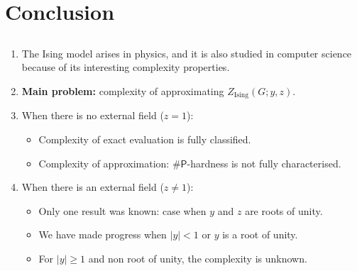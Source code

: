 \section{Conclusion}
\subsection{}

\begin{frame}
	\begin{enumerate}		
		\item The Ising model arises in physics, and it is also studied in computer science because of its interesting complexity properties.
		
		\vspace{3mm}
		\item \textbf{Main problem:} complexity of approximating $Z_{\text{Ising}}(G; y, z)$.

		\vspace{3mm}		
		\item When there is no external field ($z = 1$): 
		\begin{itemize}
			\item Complexity of exact evaluation is fully classified.
			\item Complexity of approximation: 
			$\# \mathsf{P}$-hardness is not fully characterised.
		\end{itemize}
		
		\vspace{3mm}
		\item When there is an external field ($z \ne 1$):
		\begin{itemize}
			\item Only one result was known: case when $y$ and $z$ are roots of unity.
			\item We have made progress when $|y| < 1$ or $y$ is a root of unity.
			\item For $|y|\ge 1$ and non root of unity, the complexity is unknown.
		\end{itemize}
	\end{enumerate}
\end{frame}
